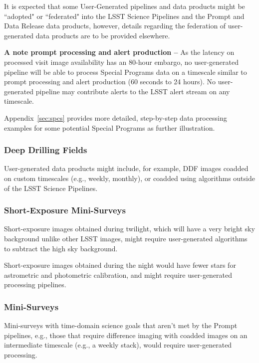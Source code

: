 It is expected that some User-Generated pipelines and data products 
might be ``adopted" or ``federated" into the LSST Science Pipelines and the Prompt 
and Data Release data products, however, details regarding the federation of 
user-generated data products are to be provided elsewhere.

\textbf{A note prompt processing and alert production -- }
As the latency on processed visit image availability has an 80-hour
embargo, no user-generated pipeline will be able to process Special Programs 
data on a timescale similar to prompt processing and alert production 
(60 seconds to 24 hours).
No user-generated pipeline may contribute alerts to the LSST alert stream on 
any timescale.

Appendix~\ref{sec:spcs} provides more detailed, step-by-step data processing examples 
for some potential Special Programs as further illustration.

\subsubsection{Deep Drilling Fields}

User-generated data products might include, for example, DDF images coadded on custom 
timescales (e.g., weekly, monthly), or coadded using algorithms outside of the LSST 
Science Pipelines.


\subsubsection{Short-Exposure Mini-Surveys}

Short-exposure images obtained during twilight, which will have a very bright sky 
background unlike other LSST images, might require user-generated algorithms to 
subtract the high sky background. 

Short-exposure images obtained during the night would have fewer stars for 
astrometric and photometric calibration, and might require user-generated 
processing pipelines.


\subsubsection{Mini-Surveys}

Mini-surveys with time-domain science goals that aren't met by the Prompt pipelines, 
e.g., those that require difference imaging with coadded images on an intermediate 
timescale (e.g., a weekly stack), would require user-generated processing.
